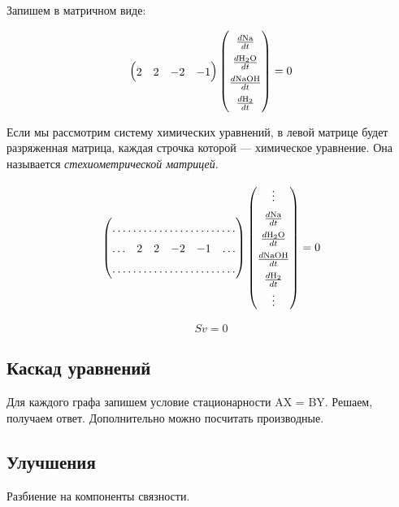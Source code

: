 \documentclass[a4paper, 12pt, left=30mm, right=15mm, top=20mm, bottom=20mm]{report}
\begin{document}
Запишем в матричном виде:

\begin{center}
	$$\begin{pmatrix}
	2 & 2 & -2 & -1
	\end{pmatrix}
	\begingroup
		\renewcommand*{\arraystretch}{1.5}
		\begin{pmatrix}
		\frac{d\ce{Na}}{dt}\\
		\frac{d\ce{H_2O}}{dt}\\
		\frac{d\ce{NaOH}}{dt}\\
		\frac{d\ce{H_2}}{dt}
		\end{pmatrix}
	\endgroup
	 = 0$$
\end{center}

Если мы рассмотрим систему химических уравнений, в левой матрице будет разряженная матрица, каждая строчка которой --- химическое уравнение. Она называется \emph{стехиометрической матрицей}.

\begin{center}
	$$\begin{pmatrix}
	\hdotsfor{6}\\
	\ldots & 2 & 2 & -2 & -1 & \ldots\\
	\hdotsfor{6}\\
	\end{pmatrix}
	\begingroup
		\renewcommand*{\arraystretch}{1.5}
		\begin{pmatrix}
		\vdots\\
		\frac{d\ce{Na}}{dt}\\
		\frac{d\ce{H_2O}}{dt}\\
		\frac{d\ce{NaOH}}{dt}\\
		\frac{d\ce{H_2}}{dt}\\
		\vdots\\
		\end{pmatrix}
	\endgroup
	= 0$$
\end{center}

\begin{center}
	$$S v = 0$$
\end{center}


\subsection{Каскад уравнений}
Для каждого графа запишем условие стационарности AX = BY. Решаем, получаем ответ. Дополнительно можно посчитать производные.

\subsection{Улучшения}
Разбиение на компоненты связности.
\end{document}
